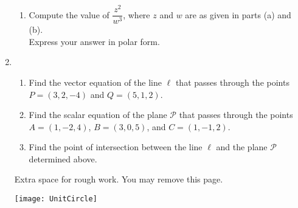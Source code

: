 \documentclass[12pt]{article}
\newcommand{\points}[1]{\marginpar{\hspace{24pt}[#1]}}
\begin{document}
\begin{enumerate}
\begin{enumerate}
 \item Compute the value of $\dfrac{z^2}{w^3}$, where $z$ and $w$ are as given in parts (a) and (b). \points{3}\\
Express your answer in polar form. 
\end{enumerate}
\newpage

\item \begin{enumerate}
\item Find the vector equation of the line $\ell$ that passes through the points $P=(3,2,-4)$ and $Q=(5,1,2)$. \points{3}

\vspace{2.25in}

\item Find the scalar equation of the plane $\mathcal{P}$ that passes through the points $A=(1,-2,4)$, $B=(3,0,5)$, and $C = (1,-1,2)$. \points{5}

\vspace{3.5in}

\item Find the point of intersection between the line $\ell$ and the plane $\mathcal{P}$ determined above. \points{4}

\end{enumerate}

\newpage

Extra space for rough work. You may remove this page.

\vspace{4in}

\begin{center}
 \texttt{[image: UnitCircle]}
\end{center}


\end{enumerate}
\end{document}
